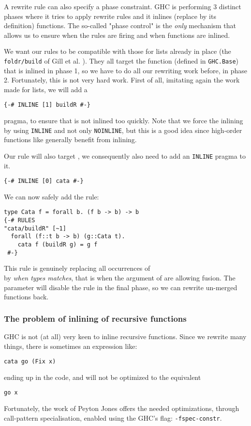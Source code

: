 A rewrite rule can also specify a phase constraint. GHC is performing 3 distinct phases where it tries to apply rewrite rules and it inlines (replace by its definition) functions. The so-called "phase control" is the \emph{only} mechanism that allows us to ensure when the rules are firing and when functions are inlined.

We want our rules to be compatible with those for lists already in place (the \verb|foldr/build| of Gill et al. \cite{Gill:1993:SCD:165180.165214}). They all target the  function (defined in \verb|GHC.Base|) that is inlined in phase 1, so we have to do all our rewriting work before, in phase 2. Fortunately, this is not very hard work. First of all, imitating again the work made for lists, we will add a
\begin{verbatim}
{-# INLINE [1] buildR #-}
\end{verbatim}
pragma, to ensure that  is not inlined too quickly. Note that we force the inlining by using \verb|INLINE| and not only \verb|NOINLINE|, but this is a good idea since high-order functions like  generally benefit from inlining.

Our rule will also target , we consequently also need to add an \verb|INLINE| pragma to it.
\begin{verbatim}
{-# INLINE [0] cata #-}
\end{verbatim}

\noindent We can now safely add the rule:
\begin{verbatim}
type Cata f = forall b. (f b -> b) -> b
{-# RULES
"cata/buildR" [~1]
  forall (f::t b -> b) (g::Cata t).
    cata f (buildR g) = g f
 #-}
\end{verbatim}
This rule is genuinely replacing all occurrences of\\  by  \emph{when types matches}, that is when the argument of  are allowing fusion. The \hs{[~1]} parameter will disable the rule in the final phase, so we can rewrite un-merged functions back.

\subsubsection{The problem of inlining of recursive functions}
GHC is not (at all) very keen to inline recursive functions. Since we rewrite many things, there is sometimes an expression like:
\begin{verbatim}
cata go (Fix x)
\end{verbatim}
ending up in the code, and will not be optimized to the equivalent
\begin{verbatim}
go x
\end{verbatim}
Fortunately, the work of Peyton Jones \cite{PeytonJones:2007:CSH:1291151.1291200} offers the needed optimizations, through call-pattern specialisation, enabled using the GHC's flag: \verb|-fspec-constr|.

